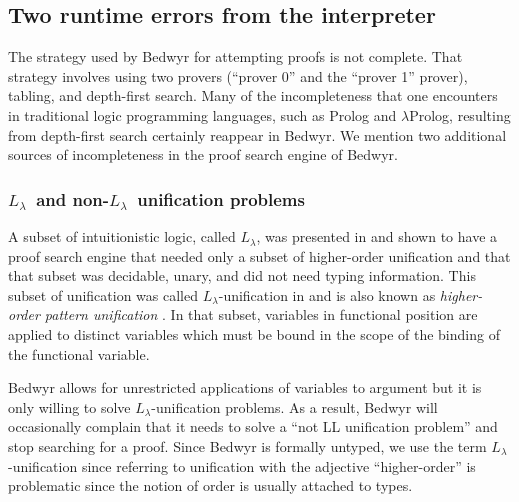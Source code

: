 \documentclass{article}
\newcommand{\lp}{$\lambda$Prolog}
\newcommand{\Ll}{$L_\lambda$}
\begin{document}


\subsection{Two runtime errors from the interpreter}

The strategy used by Bedwyr for attempting proofs is not complete.
That strategy involves using two provers (``prover 0'' and the
``prover 1'' prover), tabling, and depth-first search.  
Many of the incompleteness that one encounters in
traditional logic programming languages, such as Prolog and \lp,
resulting from depth-first search certainly reappear in Bedwyr.  We
mention two additional sources of incompleteness in the proof search
engine of Bedwyr.

\subsubsection{\Ll\ and non-\Ll\ unification problems}
A subset of intuitionistic logic, called \Ll, was presented in
\cite{miller91jlc} and shown to have a proof search engine that needed
only a subset of higher-order unification and that that subset was
decidable, unary, and did not need typing information.  This subset
of unification was called \Ll-unification in \cite{miller91jlc} and
is also known as {\em higher-order pattern unification}
\cite{nipkow93lics,nadathur05iclp}.  In that subset, variables in
functional position are applied to distinct variables which must be
bound in the scope of the binding of the functional variable.

Bedwyr allows for unrestricted applications of variables to argument
but it is only willing to solve \Ll-unification problems.  As a result,
Bedwyr will occasionally complain that it needs to solve a ``not LL
unification problem'' and stop searching for a proof.  Since Bedwyr is
formally untyped, we use the term \Ll-unification since referring to
unification with the adjective ``higher-order'' is problematic since
the notion of order is usually attached to types.
\end{document}
